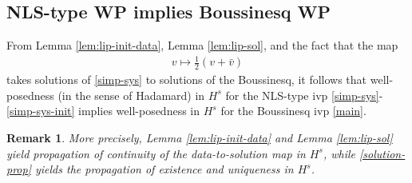 \documentclass{amsart}
\newtheorem{remark}[theorem]{Remark}
\begin{document}
\subsection{NLS-type WP implies Boussinesq WP} 
\label{ssec:wp-imp-wp}
From Lemma \ref{lem:lip-init-data}, Lemma \ref{lem:lip-sol}, and the fact that
the map
%
%
\begin{equation}
  \label{solution-prop}
\begin{split}
  v \mapsto \frac{1}{2} (v + \bar{v}) 
\end{split}
\end{equation}
%
%
takes solutions of \eqref{simp-sys} to solutions of the Boussinesq, it follows
that well-posedness (in the sense of Hadamard) in $H^{s}$ for the NLS-type ivp
\eqref{simp-sys}-\eqref{simp-sys-init} 
implies well-posedness in $H^{s}$ for the Boussinesq ivp \eqref{main}.
%
%
\begin{framed}
%
%
\begin{remark}
More precisely, Lemma \ref{lem:lip-init-data} and Lemma \ref{lem:lip-sol} yield
propagation of continuity of the data-to-solution map in $H^{s}$, while
\eqref{solution-prop} yields the propagation of existence and uniqueness in
$H^{s}$.
\label{rem:wp-imp-wp}
\end{remark}
%
%
\end{framed}
%
\end{document}
